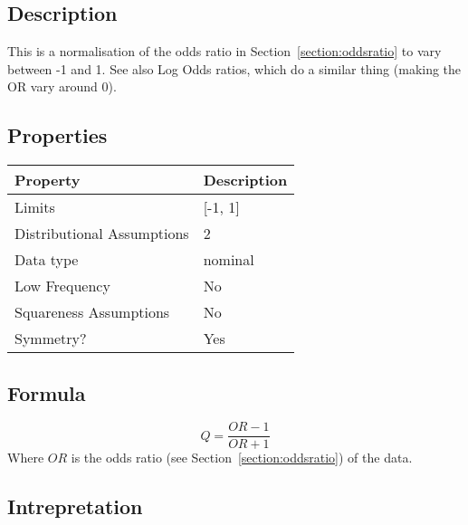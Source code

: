 \documentclass[11pt]{article}
\begin{document}
\subsection{Description}
This is a normalisation of the odds ratio in Section~\ref{section:oddsratio} to vary between -1 and 1.  
See also Log Odds ratios, which do a similar thing (making the OR vary around 0).





\subsection{Properties}
\begin{tabular}{| l || l |}
    \hline
    {\bf Property} & {\bf Description} \\
    \hline
    Limits & [-1, 1] \\ \hline

    Distributional Assumptions& 2 \\ \hline

    Data type & nominal \\ \hline

    Low Frequency & No \\ \hline

    Squareness Assumptions & No \\ \hline
    
    Symmetry? & Yes \\ \hline

\end{tabular}


\subsection{Formula}
$$
Q = \frac{OR - 1}{OR + 1}
$$
Where $OR$ is the odds ratio (see Section~\ref{section:oddsratio}) of the data.

\subsection{Intrepretation}
\end{document}
